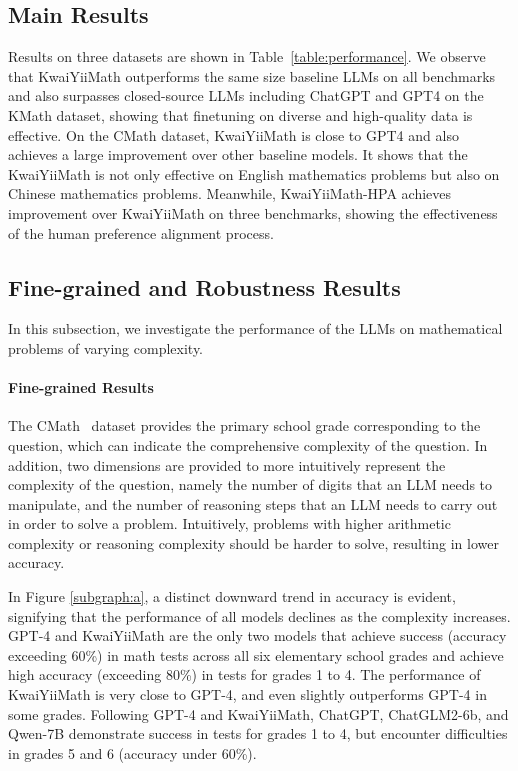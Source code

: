 \documentclass{article}
\begin{document}
\subsection{Main Results}
Results on three datasets are shown in Table~\ref{table:performance}.
We observe that KwaiYiiMath outperforms the same size baseline LLMs on all benchmarks and also surpasses closed-source LLMs including ChatGPT and GPT4 on the KMath dataset, showing that finetuning on diverse and high-quality data is effective.
On the CMath dataset, KwaiYiiMath is close to GPT4 and also achieves a large improvement over other baseline models.
It shows that the KwaiYiiMath is not only effective on English mathematics problems but also on Chinese mathematics problems.
Meanwhile, KwaiYiiMath-HPA achieves improvement over KwaiYiiMath on three benchmarks, showing the effectiveness of the human preference alignment process.




\subsection{Fine-grained and Robustness Results}
In this subsection, we investigate the performance of the LLMs on mathematical problems of varying complexity.


\paragraph{Fine-grained Results}
The CMath~\cite{wei2023cmath} dataset provides the primary school grade corresponding to the question, which can indicate the comprehensive complexity of the question. 
In addition, two dimensions are provided to more intuitively represent the complexity of the question, namely the number of digits that an LLM needs to manipulate, and the number of reasoning steps that an LLM needs to carry out in order to solve a problem.
Intuitively, problems with higher arithmetic complexity or reasoning complexity should be harder to solve, resulting in lower accuracy.

In Figure \ref{subgraph:a}, a distinct downward trend in accuracy is evident, signifying that the performance of all models declines as the complexity increases.
GPT-4 and KwaiYiiMath are the only two models that achieve success (accuracy exceeding 60\%) in math tests across all six elementary school grades and achieve high accuracy (exceeding 80\%) in tests for grades 1 to 4.
The performance of KwaiYiiMath is very close to GPT-4, and even slightly outperforms GPT-4 in some grades.
Following GPT-4 and KwaiYiiMath, ChatGPT, ChatGLM2-6b, and Qwen-7B demonstrate success in tests for grades 1 to 4, but encounter difficulties in grades 5 and 6 (accuracy under 60\%). 
\end{document}
